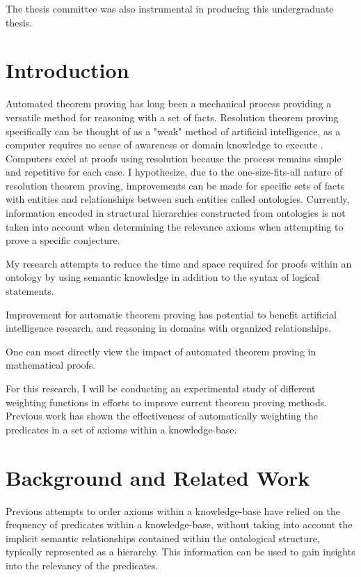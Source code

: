 \documentclass{article}
\begin{document}
The thesis committee was also instrumental in producing this undergraduate thesis.

	\newpage
	\tableofcontents

	\newpage
	\setcounter{page}{1}
	\section{Introduction}
Automated theorem proving has long been a mechanical process providing a versatile method for reasoning with a set of facts. Resolution theorem proving specifically can be thought of as a "weak" method of artificial intelligence, as a computer requires no sense of awareness or domain knowledge to execute \cite[1020]{russell2016artificial}. Computers excel at proofs using resolution because the process remains simple and repetitive for each case. I hypothesize, due to the one-size-fits-all nature of resolution theorem proving, improvements can be made for specific sets of facts with entities and relationships between such entities called ontologies. Currently, information encoded in structural hierarchies constructed from ontologies is not taken into account when determining the relevance axioms when attempting to prove a specific conjecture.  

My research attempts to reduce the time and space required for proofs within an ontology by using semantic knowledge in addition to the syntax of logical statements. 

Improvement for automatic theorem proving has potential to benefit artificial intelligence research, and reasoning in domains with organized relationships. 

One can most directly view the impact of automated theorem proving in mathematical proofs. 

For this research, I will be conducting an experimental study of different weighting functions in efforts to improve current theorem proving methods. Previous work has shown the effectiveness of automatically weighting the predicates in a set of axioms within a knowledge-base.

	\newpage
	\section{Background and Related Work}

Previous attempts to order axioms within a knowledge-base have relied on the frequency of predicates within a knowledge-base, without taking into account the implicit semantic relationships contained within the ontological structure, typically represented as a hierarchy. This information can be used to gain insights into the relevancy of the predicates. 
\end{document}
